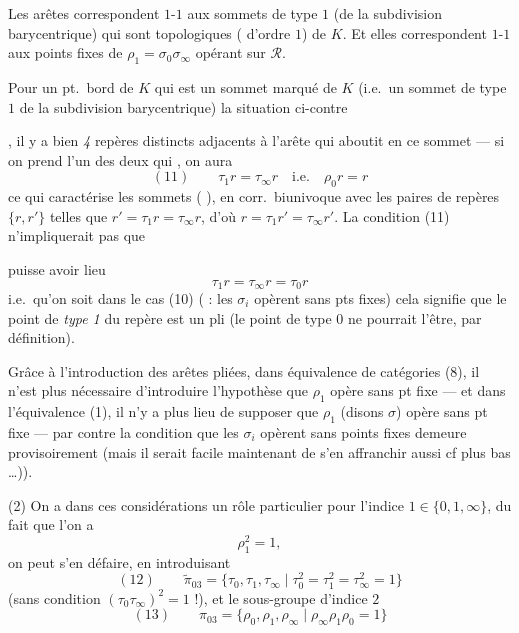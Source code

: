 \documentclass[11pt,a4paper]{article}
\begin{document}
Les arêtes  correspondent $1$-$1$ aux \og sommets de type $1$ \fg{} (de la subdivision barycentrique) qui sont topologiques ( d'ordre $1$) de $K$. Et elles correspondent $1$-$1$ aux points fixes de $\rho_{1} = \sigma_{0}\sigma_{\infty}$ opérant sur $\mathcal{R}$.

Pour un pt.\ bord de $K$ qui est un sommet marqué de $K$ (i.e.\ un sommet de type $1$ de la subdivision barycentrique) \ill{} la situation ci-contre


, il y a bien \emph{4} repères distincts adjacents à l'arête qui aboutit en ce sommet --- si on prend l'un des deux qui  \add{\ill{}} \og {} \fg{}   \ill{}, on aura
\[
  (11)\qquad \tau_{1}r = \tau_{\infty}r \quad \text{i.e.} \quad \rho_{0}r = r
\]
ce qui caractérise les sommets  (\ill{} \ill{}), en corr.\ biunivoque avec les paires de repères $\{r, r'\}$ telles que $r' = \tau_{1}r = \tau_{\infty}r$, d'où $r = \tau_{1}r' = \tau_{\infty}r'$.  La condition (11) n'impliquerait pas que

puisse avoir \struck{\ill{}} lieu
\[
  \tau_{1}r = \tau_{\infty}r = \tau_{0}r
\]
i.e.\ qu'on soit dans le cas (10) ( \ill{} :  les $\sigma_{i}$ opèrent sans pts fixes) cela signifie que le point de \emph{type 1} du repère \ill{} est un pli (le point de type $0$ ne pourrait l'être, par définition).

Grâce à l'introduction des arêtes pliées, dans  équivalence de catégories (8), il n'est plus nécessaire d'introduire l'hypothèse que $\rho_{1}$ opère sans pt fixe --- et dans l'équivalence (1), il n'y a plus lieu de supposer que $\rho_{1}$ (disons $\sigma$) opère sans pt fixe --- par contre la condition que les $\sigma_{i}$ opèrent sans points fixes demeure provisoirement (mais il serait facile maintenant de s'en affranchir aussi cf plus bas …)).

(2) On a dans ces considérations un rôle particulier pour l'indice $1 \in \{0, 1, \infty\}$, du fait que l'on a
\[
  \rho_{1}^{2} = 1 ,
\]
on peut s'en défaire, en introduisant
\[
  (12)\qquad \tilde\pi_{03} = \{\tau_{0}, \tau_{1}, \tau_{\infty} \mid \tau_{0}^{2} = \tau_{1}^{2} = \tau_{\infty}^{2} = 1\}
\]
(sans condition $(\tau_{0}\tau_{\infty})^{2} = 1$ !), et le sous-groupe d'indice $2$
\[
  (13)\qquad \pi_{03} = \{\rho_{0}, \rho_{1}, \rho_{\infty} \mid \rho_{\infty}\rho_{1}\rho_{0} = 1\}
\]
\end{document}
